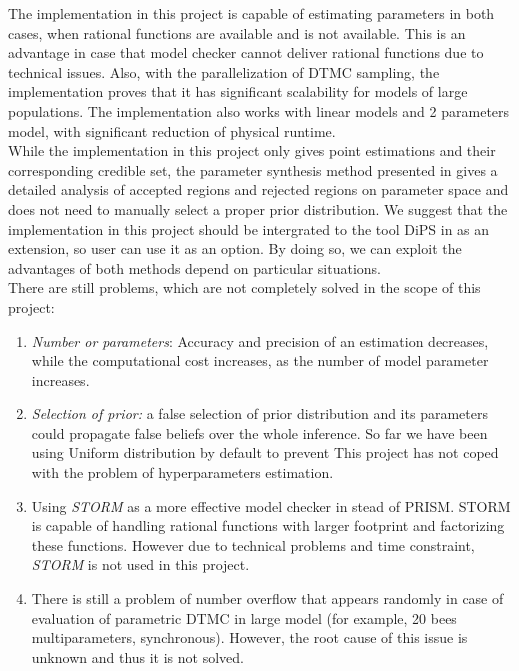 \documentclass[12pt]{article}
\theoremstyle{definition}
\begin{document}
The implementation in this project is capable of estimating parameters in both
cases, when rational functions are available and is not available. This is an
advantage in case that model checker cannot deliver rational functions due to
technical issues. Also, with the parallelization of DTMC sampling, the
implementation proves that it has significant scalability for models of large
populations. The implementation also works with linear models and 2 parameters
model, with significant reduction of physical runtime.\\

While the implementation in this project only gives point estimations and their
corresponding credible set, the parameter synthesis method presented in
\cite{hajnal2019data} gives a detailed analysis of accepted regions and rejected
regions on parameter space and does not need to manually select a proper prior
distribution. We suggest that the implementation in this project should be
intergrated to the tool DiPS in \cite{hajnal2019data} as an extension, so user
can use it as an option. By doing so, we can exploit the advantages of both
methods depend on particular situations.\\
There are still problems, which are not completely solved in the scope of this
project:
\begin{enumerate}
\item \textit{Number or parameters}: Accuracy and precision of an estimation
  decreases, while the computational cost increases, as the number of model
  parameter increases.
\item \textit{Selection of prior:} a false selection of prior distribution and
  its parameters could propagate false beliefs over the whole inference. So far
  we have been using Uniform distribution by default to prevent 
  This project has not coped with the problem of hyperparameters
  estimation.
\item Using \textit{STORM} \cite{dehnert2017storm} as a more effective model
  checker in stead of PRISM. STORM is capable of handling rational functions
  with larger footprint and factorizing these functions. However due to
  technical problems and time constraint, \textit{STORM} is not used in this
  project.
\item There is still a problem of number overflow that appears randomly in case
  of evaluation of parametric DTMC in large model (for example, 20 bees
  multiparameters, synchronous). However, the root cause of this issue is
  unknown and thus it is not solved.
\end{enumerate}

\newpage
\printbibliography
\end{document}
